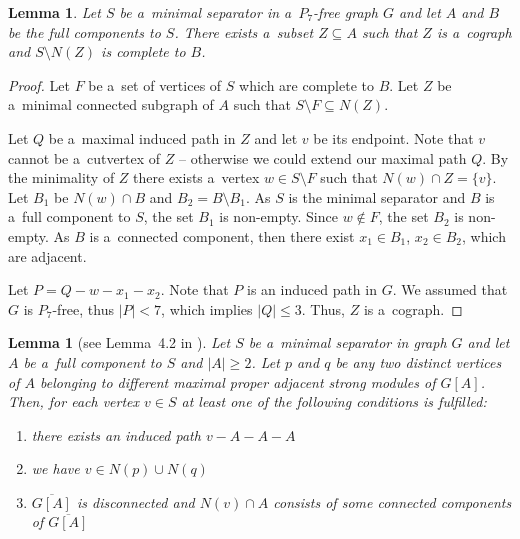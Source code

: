 \documentclass[11pt,a4paper]{article}
\newtheorem{lemma}[theorem]{Lemma}
\theoremstyle{definition}
\begin{document}
\begin{lemma}\label{lem:p_four}
    Let $S$ be a~minimal separator in a~$P_7$-free graph $G$ and let $A$ and $B$ be the full components to $S$. There exists a~subset $Z\subseteq A$ such that $Z$ is a~cograph and $S\setminus N(Z)$ is complete to $B$.
\end{lemma}
\begin{proof}
    Let $F$ be a~set of vertices of $S$ which are complete to $B$. Let $Z$ be a~minimal connected subgraph of $A$ such that $S\setminus F \subseteq N(Z)$. 

    Let $Q$ be a~maximal induced path in $Z$ and let $v$ be its endpoint. Note that $v$ cannot be a~cutvertex of $Z$ -- otherwise we could extend our maximal path $Q$. By the minimality of $Z$ there exists a~vertex $w \in S\setminus F$ such that $N(w)\cap Z = \{v\}$. 
    Let $B_1$ be $N(w)\cap B$ and $B_2=B\setminus B_1$. As $S$ is the minimal separator and $B$ is a~full component to $S$, the set $B_1$ is non-empty. Since $w\notin F$, the set $B_2$ is non-empty. As $B$ is a~connected component, then there exist $x_1\in B_1$, $x_2\in B_2$, which are adjacent.

    Let $P=Q - w- x_1- x_2$. Note that $P$ is an induced path in $G$. We assumed that $G$ is $P_7$-free, thus $|P| < 7$, which implies $|Q|\leq 3$. Thus, $Z$ is a~cograph.
\end{proof}

\begin{lemma}[see Lemma~4.2 in \cite{grzesik2020polynomialtime}]\label{lem:module_lemma}
    Let $S$ be a~minimal separator in graph $G$ and let $A$ be a~full component to $S$ and $|A|\geq 2$. Let $p$ and $q$ be any two distinct vertices of $A$ belonging to different maximal proper adjacent strong modules of $G[A]$. Then, for each vertex $v\in S$ at least one of the following conditions is fulfilled:
    \begin{enumerate}
        \item there exists an induced path $v-A-A-A$
        \item we have $v\in N(p)\cup N(q)$
        \item  $\overline{G[A]}$ is disconnected and $N(v)\cap A$ consists of some connected components of $\overline{G[A]}$
    \end{enumerate}
\end{lemma}
\end{document}
